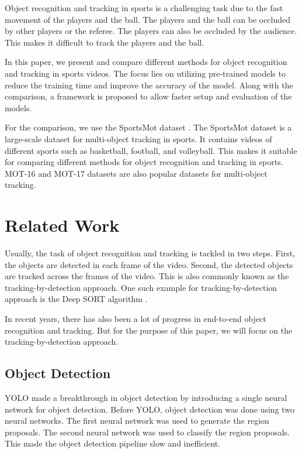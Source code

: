 \documentclass[runningheads]{llncs}
\begin{document}
Object recognition and tracking in sports is a challenging task due to the fast movement of the players and the ball.
The players and the ball can be occluded by other players or the referee.
The players can also be occluded by the audience.
This makes it difficult to track the players and the ball.

In this paper, we present and compare different methods for object recognition and tracking in sports videos.
The focus lies on utilizing pre-trained models to reduce the training time and improve the accuracy of the model.
Along with the comparison, a framework is proposed to allow faster setup and evaluation of the models.

For the comparison, we use the SportsMot dataset \cite{cui2023sportsmot}.
The SportsMot dataset is a large-scale dataset for multi-object tracking in sports.
It contains videos of different sports such as basketball, football, and volleyball.
This makes it suitable for comparing different methods for object recognition and tracking in sports.
MOT-16 and MOT-17 datasets \cite{milan2016mot16} are also popular datasets for multi-object tracking.


\section{Related Work}
Usually, the task of object recognition and tracking is tackled in two steps.
First, the objects are detected in each frame of the video.
Second, the detected objects are tracked across the frames of the video.
This is also commonly known as the tracking-by-detection approach.
One such example for tracking-by-detection approach is the Deep SORT algorithm \cite{DBLP:journals/corr/abs-1907-03465}.

In recent years, there has also been a lot of progress in end-to-end object recognition and tracking.
But for the purpose of this paper, we will focus on the tracking-by-detection approach.



\subsection{Object Detection}

YOLO \cite{yolo2015} made a breakthrough in object detection by introducing a single neural network for object detection.
Before YOLO, object detection was done using two neural networks.
The first neural network was used to generate the region proposals.
The second neural network was used to classify the region proposals.
This made the object detection pipeline slow and inefficient.
\end{document}
